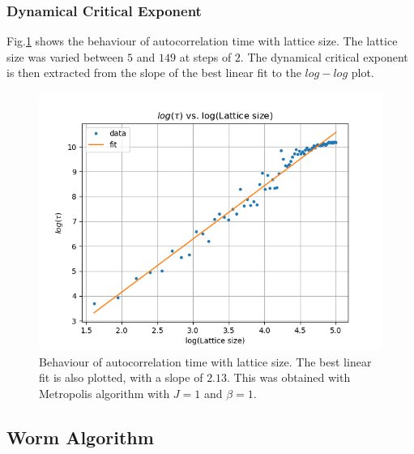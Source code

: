 \documentclass[%
reprint,
 amsmath,amssymb,
 aps,
]{revtex4-2}
\begin{document}
\subsubsection{Dynamical Critical Exponent}
Fig.\ref{fig:metrodyn} shows the behaviour of autocorrelation time with lattice size. The lattice size was varied between $5$ and $149$ at steps of $2$. The dynamical critical exponent is then extracted from the slope of the best linear fit to the $log-log$ plot.
\begin{figure}[h!]
    \centering
    \includegraphics[width=\columnwidth]{metro_dyncritexp.png}
    \caption{Behaviour of autocorrelation time with lattice size. The best linear fit is also plotted, with a slope of $2.13$. This was obtained with Metropolis algorithm with $J=1$ and $\beta=1$.}
    \label{fig:metrodyn}
\end{figure}

\subsection{Worm Algorithm}
\end{document}
